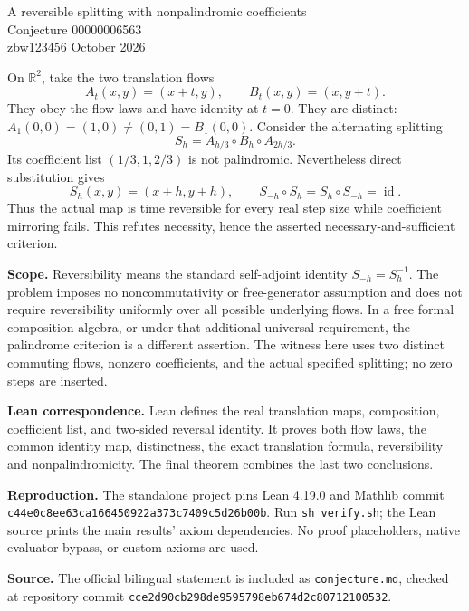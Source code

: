 \documentclass[11pt]{article}
\begin{document}
\begin{center}{\Large A reversible splitting with nonpalindromic coefficients}\\[6pt]
{\large Conjecture 00000006563}\\[5pt]
zbw123456  October 2026\end{center}

On $\mathbb R^2$, take the two translation flows
\[
A_t(x,y)=(x+t,y),\qquad B_t(x,y)=(x,y+t).
\]
They obey the flow laws and have identity at $t=0$. They are distinct:
$A_1(0,0)=(1,0)\ne(0,1)=B_1(0,0)$.
Consider the alternating splitting
\[
S_h=A_{h/3}\circ B_h\circ A_{2h/3}.
\]
Its coefficient list $(1/3,1,2/3)$ is not palindromic.
Nevertheless direct substitution gives
\[
S_h(x,y)=(x+h,y+h),\qquad
S_{-h}\circ S_h=S_h\circ S_{-h}=\operatorname{id}.
\]
Thus the actual map is time reversible for every real step size while
coefficient mirroring fails. This refutes necessity, hence the asserted
necessary-and-sufficient criterion.

\textbf{Scope.} Reversibility means the standard self-adjoint identity
$S_{-h}=S_h^{-1}$. The problem imposes no noncommutativity or free-generator
assumption and does not require reversibility uniformly over all possible
underlying flows. In a free formal composition algebra, or under that
additional universal requirement, the palindrome criterion is a different
assertion. The witness here uses two distinct commuting flows, nonzero
coefficients, and the actual specified splitting; no zero steps are inserted.

\textbf{Lean correspondence.} Lean defines the real translation maps,
composition, coefficient list, and two-sided reversal identity.
It proves both flow laws, the common identity map, distinctness,
the exact translation formula, reversibility and nonpalindromicity.
The final theorem combines the last two conclusions.

\textbf{Reproduction.} The standalone project pins Lean 4.19.0 and Mathlib
commit \texttt{c44e0c8ee63ca166450922a373c7409c5d26b00b}.
Run \texttt{sh verify.sh}; the Lean source prints the main results'
axiom dependencies. No proof placeholders, native evaluator bypass, or
custom axioms are used.

\textbf{Source.} The official bilingual statement is included as
\texttt{conjecture.md}, checked at repository commit
\texttt{cce2d90cb298de9595798eb674d2c80712100532}.
\end{document}

